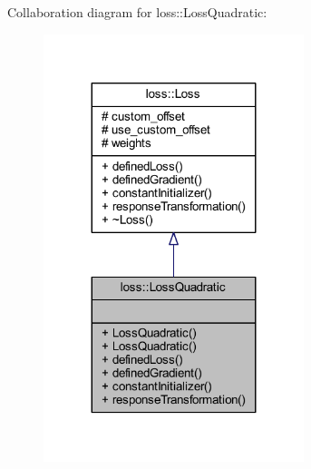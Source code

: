 Collaboration diagram for loss\+:\+:Loss\+Quadratic\+:
\nopagebreak
\begin{figure}[H]
\begin{center}
\leavevmode
\includegraphics[width=215pt]{classloss_1_1_loss_quadratic__coll__graph}
\end{center}
\end{figure}
